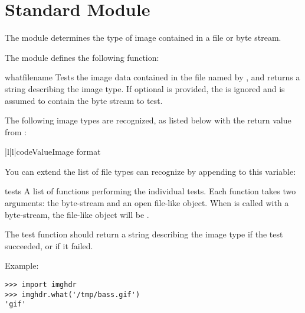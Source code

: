 \section{Standard Module }
\label{module-imghdr}

The  module determines the type of image contained in a
file or byte stream.

The  module defines the following function:


\begin{funcdesc}{what}{filename}
Tests the image data contained in the file named by ,
and returns a string describing the image type.  If optional 
is provided, the  is ignored and  is assumed to
contain the byte stream to test.
\end{funcdesc}

The following image types are recognized, as listed below with the
return value from :

\begin{tableii}{|l|l|}{code}{Value}{Image format}
\end{tableii}

You can extend the list of file types  can recognize by
appending to this variable:

\begin{datadesc}{tests}
A list of functions performing the individual tests.  Each function
takes two arguments: the byte-stream and an open file-like object.
When  is called with a byte-stream, the file-like
object will be .

The test function should return a string describing the image type if
the test succeeded, or  if it failed.
\end{datadesc}

Example:

\begin{verbatim}
>>> import imghdr
>>> imghdr.what('/tmp/bass.gif')
'gif'
\end{verbatim}
